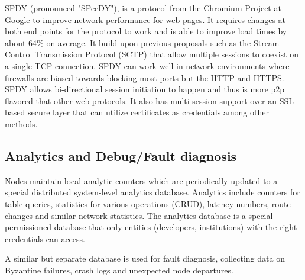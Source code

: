 SPDY (pronounced "SPeeDY"), is a protocol from the Chromium Project at Google \cite{speedy_protocol} to improve network performance for web
pages. It requires changes at both end points for the protocol to work and is able to improve load times by about 64\%
on average. It build upon previous proposals such as the Stream Control Transmission Protocol (SCTP) \cite{sctp}
\cite{sctp_rfc} that allow multiple sessions to coexist on a single TCP connection. SPDY can work well in network
environments where firewalls are biased towards blocking most ports but the HTTP and HTTPS. SPDY allows bi-directional
session initiation to happen and thus is more p2p flavored that other web protocols. It also has multi-session support
over an SSL based secure layer that can utilize certificates as credentials among other methods.


\subsection{Analytics and Debug/Fault diagnosis}
\label{net:analytics}

Nodes maintain local analytic counters which are periodically updated to a special distributed system-level analytics
database. Analytics include counters for table queries, statistics for various operations (CRUD), latency numbers, route
changes and similar network statistics. The analytics database is a special permissioned database that only entities
(developers, institutions) with the right credentials can access.

A similar but separate database is used for fault diagnosis, collecting data on Byzantine failures, crash logs and
unexpected node departures. 
